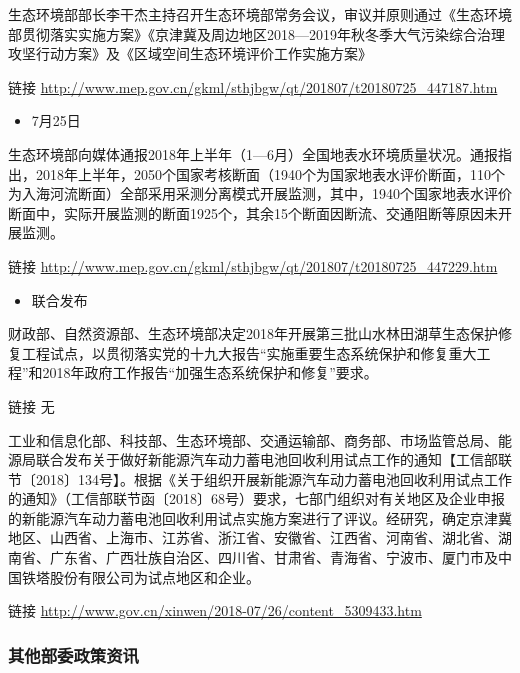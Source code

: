 \documentclass[]{book}
\providecommand{\tightlist}{%
  \setlength{\itemsep}{0pt}\setlength{\parskip}{0pt}}
\begin{document}
生态环境部部长李干杰主持召开生态环境部常务会议，审议并原则通过《生态环境部贯彻落实实施方案》《京津冀及周边地区2018---2019年秋冬季大气污染综合治理攻坚行动方案》及《区域空间生态环境评价工作实施方案》

链接 \url{http://www.mep.gov.cn/gkml/sthjbgw/qt/201807/t20180725_447187.htm}

\begin{itemize}
\tightlist
\item
  7月25日
\end{itemize}

生态环境部向媒体通报2018年上半年（1---6月）全国地表水环境质量状况。通报指出，2018年上半年，2050个国家考核断面（1940个为国家地表水评价断面，110个为入海河流断面）全部采用采测分离模式开展监测，其中，1940个国家地表水评价断面中，实际开展监测的断面1925个，其余15个断面因断流、交通阻断等原因未开展监测。

链接 \url{http://www.mep.gov.cn/gkml/sthjbgw/qt/201807/t20180725_447229.htm}

\begin{itemize}
\tightlist
\item
  联合发布
\end{itemize}

财政部、自然资源部、生态环境部决定2018年开展第三批山水林田湖草生态保护修复工程试点，以贯彻落实党的十九大报告``实施重要生态系统保护和修复重大工程''和2018年政府工作报告``加强生态系统保护和修复''要求。

链接 无

工业和信息化部、科技部、生态环境部、交通运输部、商务部、市场监管总局、能源局联合发布关于做好新能源汽车动力蓄电池回收利用试点工作的通知【工信部联节〔2018〕134号】。根据《关于组织开展新能源汽车动力蓄电池回收利用试点工作的通知》（工信部联节函〔2018〕68号）要求，七部门组织对有关地区及企业申报的新能源汽车动力蓄电池回收利用试点实施方案进行了评议。经研究，确定京津冀地区、山西省、上海市、江苏省、浙江省、安徽省、江西省、河南省、湖北省、湖南省、广东省、广西壮族自治区、四川省、甘肃省、青海省、宁波市、厦门市及中国铁塔股份有限公司为试点地区和企业。

链接 \url{http://www.gov.cn/xinwen/2018-07/26/content_5309433.htm}

\hypertarget{ux5176ux4ed6ux90e8ux59d4ux653fux7b56ux8d44ux8baf-3}{%
\subsubsection*{其他部委政策资讯}\label{ux5176ux4ed6ux90e8ux59d4ux653fux7b56ux8d44ux8baf-3}}
\end{document}
